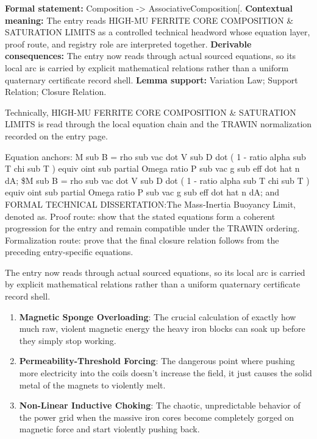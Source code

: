 \begingroup\footnotesize\setlength{\emergencystretch}{3em}\sloppy
\textbf{Formal statement:} Composition -> AssociativeComposition[. \textbf{Contextual meaning:} The entry reads HIGH-MU FERRITE CORE COMPOSITION \& SATURATION LIMITS as a controlled technical headword whose equation layer, proof route, and registry role are interpreted together. \textbf{Derivable consequences:} The entry now reads through actual sourced equations, so its local arc is carried by explicit mathematical relations rather than a uniform quaternary certificate record shell. \textbf{Lemma support:} Variation Law; Support Relation; Closure Relation.\par
\endgroup

Technically, HIGH-MU FERRITE CORE COMPOSITION \& SATURATION LIMITS is read through the local equation chain and the TRAWIN normalization recorded on the entry page.

Equation anchors: M sub B = rho sub vac dot V sub D dot ( 1 - ratio alpha sub T chi sub T ) equiv oint sub partial Omega ratio P sub vac g sub eff dot hat n dA; \$M sub B = rho sub vac dot V sub D dot ( 1 - ratio alpha sub T chi sub T ) equiv oint sub partial Omega ratio P sub vac g sub eff dot hat n dA; and FORMAL TECHNICAL DISSERTATION:The Mass-Inertia Buoyancy Limit, denoted as. Proof route: show that the stated equations form a coherent progression for the entry and remain compatible under the TRAWIN ordering. Formalization route: prove that the final closure relation follows from the preceding entry-specific equations.

The entry now reads through actual sourced equations, so its local arc is carried by explicit mathematical relations rather than a uniform quaternary certificate record shell.
\endgroup

\begin{enumerate}[leftmargin=1.6em,itemsep=6pt,topsep=4pt]
\item \textbf{Magnetic Sponge Overloading}: The crucial calculation of exactly how much raw, violent magnetic energy the heavy iron blocks can soak up before they simply stop working.
\item \textbf{Permeability-Threshold Forcing}: The dangerous point where pushing more electricity into the coils doesn't increase the field, it just causes the solid metal of the magnets to violently melt.
\item \textbf{Non-Linear Inductive Choking}: The chaotic, unpredictable behavior of the power grid when the massive iron cores become completely gorged on magnetic force and start violently pushing back.
\end{enumerate}

